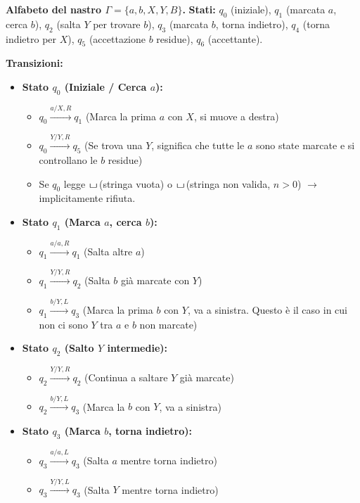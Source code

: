 \documentclass[a4paper]{article}
\theoremstyle{definition} %
\newcommand{\blankS}{\ensuremath{\raisebox{-0.15ex}{\scalebox{1.3}[0.7]{$\sqcup$}}\mkern2mu}}
\begin{document}
\noindent \textbf{Alfabeto del nastro $\Gamma = \{a, b, X, Y, B\}$.}
\noindent \textbf{Stati:} $q_0$ (iniziale), $q_1$ (marcata $a$, cerca $b$), $q_2$ (salta $Y$ per trovare $b$), $q_3$ (marcata $b$, torna indietro), $q_4$ (torna indietro per $X$), $q_5$ (accettazione $b$ residue), $q_6$ (accettante).

\noindent \textbf{Transizioni:}
\begin{itemize}
    \item \textbf{Stato $q_0$ (Iniziale / Cerca $a$):}
        \begin{itemize}
            \item $q_0 \xrightarrow{a / X, R} q_1$ (Marca la prima $a$ con $X$, si muove a destra)
            \item $q_0 \xrightarrow{Y / Y, R} q_5$ (Se trova una $Y$, significa che tutte le $a$ sono state marcate e si controllano le $b$ residue)
            \item Se $q_0$ legge \blankS (stringa vuota) o \blankS (stringa non valida, $n > 0$) $\to$ implicitamente rifiuta.
        \end{itemize}
    \item \textbf{Stato $q_1$ (Marca $a$, cerca $b$):}
        \begin{itemize}
            \item $q_1 \xrightarrow{a / a, R} q_1$ (Salta altre $a$)
            \item $q_1 \xrightarrow{Y / Y, R} q_2$ (Salta $b$ già marcate con $Y$)
            \item $q_1 \xrightarrow{b / Y, L} q_3$ (Marca la prima $b$ con $Y$, va a sinistra. Questo è il caso in cui non ci sono $Y$ tra $a$ e $b$ non marcate)
        \end{itemize}
    \item \textbf{Stato $q_2$ (Salto $Y$ intermedie):}
        \begin{itemize}
            \item $q_2 \xrightarrow{Y / Y, R} q_2$ (Continua a saltare $Y$ già marcate)
            \item $q_2 \xrightarrow{b / Y, L} q_3$ (Marca la $b$ con $Y$, va a sinistra)
        \end{itemize}
    \item \textbf{Stato $q_3$ (Marca $b$, torna indietro):}
        \begin{itemize}
            \item $q_3 \xrightarrow{a / a, L} q_3$ (Salta $a$ mentre torna indietro)
            \item $q_3 \xrightarrow{Y / Y, L} q_3$ (Salta $Y$ mentre torna indietro)

\end{itemize}
\end{itemize}
\end{document}
